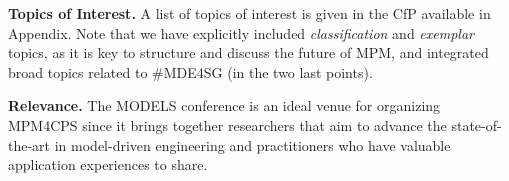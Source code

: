 \smallskip
\noindent
\textbf{Topics of Interest.}
%
A list of topics of interest is given in the CfP available in Appendix.
Note that we have explicitly included \emph{classification} and \emph{exemplar} 
topics, as it is key to structure and discuss the future of MPM, and integrated 
broad topics related to \#MDE4SG (in the two last points).



\noindent
\textbf{Relevance.}
%
The MODELS conference is an ideal venue for organizing MPM4CPS since it brings 
together researchers that aim to advance the state-of-the-art in model-driven 
engineering and practitioners who have valuable application experiences to share.





